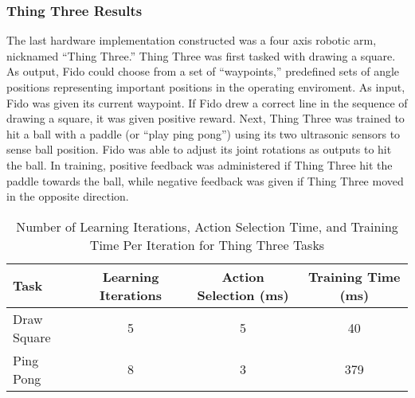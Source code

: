 \subsubsection{Thing Three Results}

The last hardware implementation constructed was a four axis robotic arm, nicknamed ``Thing Three.''
Thing Three was first tasked with drawing a square.
As output, Fido could choose from a set of ``waypoints,'' predefined sets of angle positions representing important positions in the operating enviroment.
As input, Fido was given its current waypoint.
If Fido drew a correct line in the sequence of drawing a square, it was given positive reward.
Next, Thing Three was trained to hit a ball with a paddle (or ``play ping pong'') using its two ultrasonic sensors to sense ball position.
Fido was able to adjust its joint rotations as outputs to hit the ball.
In training, positive feedback was administered if Thing Three hit the paddle towards the ball, while negative feedback was given if Thing Three moved in the opposite direction.

\begin{table}[ht]
	\centering
	\begin{tabular}{@{}lccc@{}}
		\toprule
		Task              & Learning Iterations & Action Selection (ms) & Training Time (ms) \\ \midrule
		Draw Square         & 5                   & 5                    & 40                 \\
		Ping Pong          & 8                  & 3                    & 379                \\
		\bottomrule
	\end{tabular}
	\caption {Number of Learning Iterations, Action Selection Time, and Training Time Per Iteration for Thing Three Tasks} \label{tab:thingthreeresults}
\end{table}

